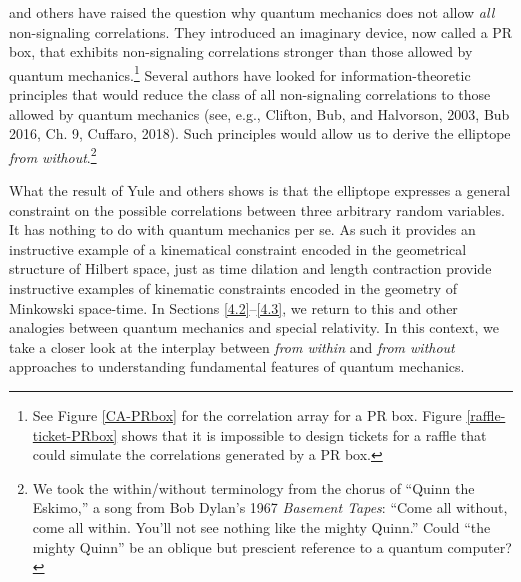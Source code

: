 \citet{Popescu and Rohrlich 1994} and others have raised the question why quantum mechanics does not allow \emph{all} non-signaling correlations. They introduced an imaginary device, now called a PR box, that exhibits non-signaling correlations stronger than those allowed by quantum mechanics.\footnote{See Figure \ref{CA-PRbox} for the correlation array for a PR box. Figure \ref{raffle-ticket-PRbox} shows that it is impossible to design tickets for a raffle that could simulate the correlations generated by a PR box.} Several authors have looked for information-theoretic principles that would reduce the class of all non-signaling correlations to those allowed by quantum mechanics (see, e.g., Clifton, Bub, and Halvorson, 2003, Bub 2016, Ch. 9, Cuffaro, 2018). Such principles would allow us to derive the elliptope \emph{from without}.\footnote{We took the within/without terminology from the chorus of ``Quinn the Eskimo,'' a song from Bob Dylan's 1967 \emph{Basement Tapes}: ``Come all without, come all within. You'll not see nothing like the mighty Quinn.'' Could ``the mighty Quinn'' be an oblique but prescient reference to a quantum computer?\label{Dylan}} 

What the result of Yule and others shows is that the elliptope expresses a general constraint on the possible correlations between three arbitrary random variables. It has nothing to do with quantum mechanics per se. As such it provides an instructive example of a kinematical constraint encoded in the geometrical structure of Hilbert space, just as time dilation and length contraction provide instructive examples of kinematic constraints encoded in the geometry of Minkowski space-time.  In Sections \ref{4.2}--\ref{4.3}, we return to this and other analogies between quantum mechanics and special relativity. In this context, we take a closer look at the interplay between \emph{from within} and \emph{from without} approaches to understanding fundamental features of quantum mechanics. 

